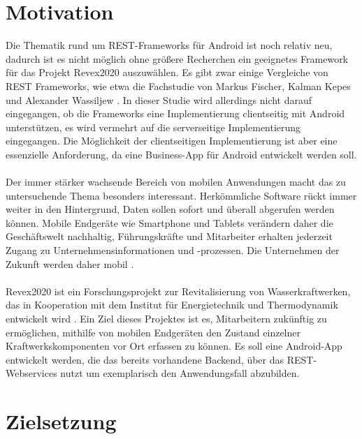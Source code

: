 \section{Motivation}
Die Thematik rund um REST-Frameworks für Android ist noch relativ neu, dadurch ist es nicht möglich ohne größere Recherchen ein geeignetes Framework für das Projekt Revex2020 auszuwählen. Es gibt zwar einige Vergleiche von REST Frameworks, wie etwa die Fachstudie von Markus Fischer, Kalman Kepes und Alexander Wassiljew \cite{vergleich13}. In dieser Studie wird allerdings nicht darauf eingegangen, ob die Frameworks eine Implementierung clientseitig mit Android unterstützen, es wird vermehrt auf die serverseitige Implementierung eingegangen. Die Möglichkeit der clientseitigen Implementierung ist aber eine essenzielle Anforderung, da eine Business-App für Android entwickelt werden soll. 
\\\\
Der immer stärker wachsende Bereich von mobilen Anwendungen macht das zu untersuchende Thema besonders interessant. Herkömmliche Software rückt immer weiter in den Hintergrund, Daten sollen sofort und überall abgerufen werden können. Mobile Endgeräte wie Smartphone und Tablets verändern daher die Geschäftswelt nachhaltig, Führungskräfte und Mitarbeiter erhalten jederzeit Zugang zu Unternehmensinformationen und -prozessen. Die Unternehmen der Zukunft werden daher mobil \cite{smartMobileApps7}.  
\\\\
Revex2020 ist ein Forschungsprojekt zur Revitalisierung von Wasserkraftwerken, das in Kooperation mit dem Institut für Energietechnik und Thermodynamik entwickelt wird \cite{doujak}. Ein Ziel dieses Projektes ist es, Mitarbeitern zukünftig zu ermöglichen, mithilfe von mobilen Endgeräten den Zustand einzelner Kraftwerkskomponenten vor Ort erfassen zu können. Es soll eine Android-App entwickelt werden, die das bereits vorhandene Backend, über das REST-Webservices nutzt um exemplarisch den Anwendungsfall abzubilden.

\section{Zielsetzung}

